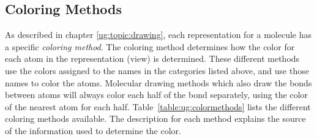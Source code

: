 \subsection{Coloring Methods}
\label{ug:topic:coloring:methods}

As described in chapter \ref{ug:topic:drawing}, each representation
for a molecule has a specific {\em coloring method}.  The coloring
method determines how the color for each atom in the representation
(view) is determined.  These different methods use the colors assigned
to the names in the categories listed above, and use those names to
color the atoms.  Molecular drawing methods which also draw the bonds
between atoms will always color each half of the bond separately,
using the color of the nearest atom for each half.  
Table~\ref{table:ug:colormethods} lists the different coloring methods
available.  The description for each method explains the source of
the information used to determine the color.

